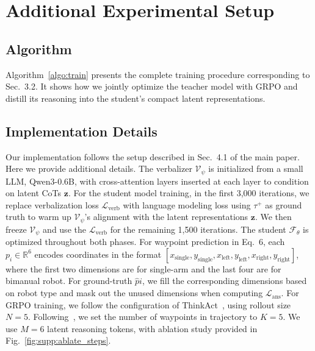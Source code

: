 \appendix



\newcommand{\refcolor}[1]{\textcolor{nvidiagreen}{#1}}



\section{Additional Experimental Setup}

\subsection{Algorithm}



Algorithm~\ref{algo:train} presents the complete training procedure corresponding to Sec.~\refcolor{3.2}. It shows how we jointly optimize the teacher model with GRPO and distill its reasoning into the student's compact latent representations.

\subsection{Implementation Details}

Our implementation follows the setup described in Sec.~\refcolor{4.1} of the main paper. Here we provide additional details. The verbalizer $\mathcal{V}_\psi$ is initialized from a small LLM, Qwen3-0.6B, with cross-attention layers inserted at each layer to condition on latent CoTs $\mathbf{z}$. For the student model training, in the first 3,000 iterations, we replace verbalization loss $\mathcal{L}_{\text{verb}}$ with language modeling loss using $\tau^+$ as ground truth to warm up $\mathcal{V}_\psi$'s alignment with the latent representations $\mathbf{z}$. We then freeze $\mathcal{V}_\psi$ and use the $\mathcal{L}_{\text{verb}}$ for the remaining 1,500 iterations. The student $\mathcal{F}_\theta$ is optimized throughout both phases. For waypoint prediction in Eq.~\refcolor{6}, each $p_i \in \mathbb{R}^6$ encodes coordinates in the format $[x_{\text{single}}, y_{\text{single}}, x_{\text{left}}, y_{\text{left}}, x_{\text{right}}, y_{\text{right}}]$, where the first two dimensions are for single-arm and the last four are for bimanual robot. For ground-truth $\hat{p}i$, we fill the corresponding dimensions based on robot type and mask out the unused dimensions when computing $\mathcal{L}_{\text{ans}}$. For GRPO training, we follow the configuration of ThinkAct~\cite{huang2025thinkact}, using rollout size $N=5$. Following~\cite{lee2025molmoact}, we set the number of waypoints in trajectory to $K=5$. We use $M=6$ latent reasoning tokens, with ablation study provided in Fig.~\ref{fig:supp:ablate_steps}.

